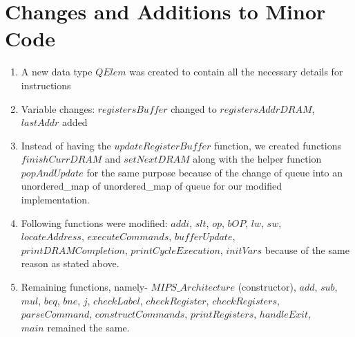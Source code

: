 \documentclass{article}
\begin{document}
\section{Changes and Additions to Minor Code}
\begin{enumerate}
    \item A new data type $QElem$ was created to contain all the necessary details for instructions
    \item Variable changes: $registersBuffer$ changed to $registersAddrDRAM$, $lastAddr$ added
    \item Instead of having the $updateRegisterBuffer$ function, we created functions $finishCurrDRAM$ and $setNextDRAM$ along with the helper function $popAndUpdate$ for the same purpose because of the change of queue into an unordered\_map of unordered\_map of queue for our modified implementation.
    \item Following functions were modified: $addi$, $slt$, $op$, $bOP$, $lw$, $sw$,\\ $locateAddress$, $executeCommands$, $bufferUpdate$,\\ $printDRAMCompletion$, $printCycleExecution$, $initVars$ because of the same reason as stated above.
    \item Remaining functions, namely- $MIPS\_Architecture$ (constructor), $add$, $sub$, $mul$, $beq$, $bne$, $j$, $checkLabel$, $checkRegister$, $checkRegisters$,\\ $parseCommand$, $constructCommands$, $printRegisters$, $handleExit$,\\ $main$ remained the same. 
\end{enumerate}
\end{document}
